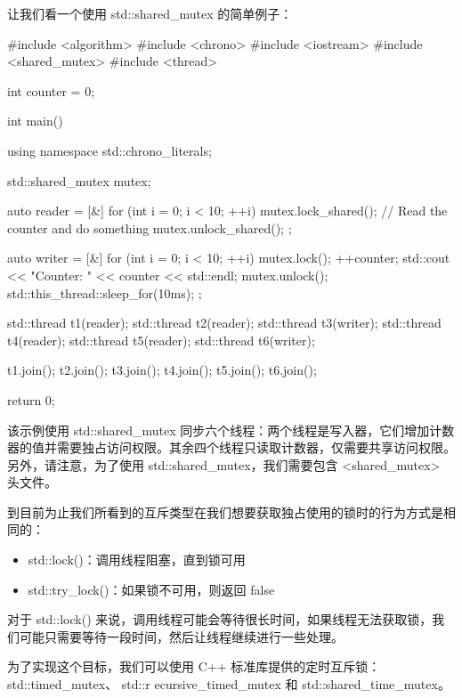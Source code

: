 让我们看一个使用 std::shared\_mutex 的简单例子：

\begin{cpp}
#include <algorithm>
#include <chrono>
#include <iostream>
#include <shared_mutex>
#include <thread>

int counter = 0;

int main() {
    using namespace std::chrono_literals;

    std::shared_mutex mutex;

    auto reader = [&] {
        for (int i = 0; i < 10; ++i) {
            mutex.lock_shared();
            // Read the counter and do something
            mutex.unlock_shared();
        }
    };

    auto writer = [&] {
        for (int i = 0; i < 10; ++i) {
            mutex.lock();
            ++counter;
            std::cout << "Counter: " << counter << std::endl;
            mutex.unlock();
            std::this_thread::sleep_for(10ms);
        }
    };

    std::thread t1(reader);
    std::thread t2(reader);
    std::thread t3(writer);
    std::thread t4(reader);
    std::thread t5(reader);
    std::thread t6(writer);

    t1.join();
    t2.join();
    t3.join();
    t4.join();
    t5.join();
    t6.join();

    return 0;
}
\end{cpp}

该示例使用 std::shared\_mutex 同步六个线程：两个线程是写入器，它们增加计数器的值并需要独占访问权限。其余四个线程只读取计数器，仅需要共享访问权限。另外，请注意，为了使用 std::shared\_mutex，我们需要包含 <shared\_mutex> 头文件。


到目前为止我们所看到的互斥类型在我们想要获取独占使用的锁时的行为方式是相同的：

\begin{itemize}
\item
std::lock()：调用线程阻塞，直到锁可用

\item
std::try\_lock()：如果锁不可用，则返回 false
\end{itemize}

对于 std::lock() 来说，调用线程可能会等待很长时间，如果线程无法获取锁，我们可能只需要等待一段时间，然后让线程继续进行一些处理。

为了实现这个目标，我们可以使用 C++ 标准库提供的定时互斥锁： std::timed\_mutex、 std::r ecursive\_timed\_mutex 和 std::shared\_time\_mutex。

